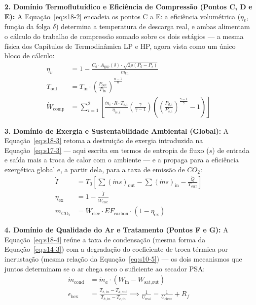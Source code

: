 \documentclass[12pt,a4paper]{article}
\numberwithin{equation}{section}
\numberwithin{table}{section}
\numberwithin{figure}{section}
\begin{document}
\textbf{2. Domínio Termoflutuídico e Eficiência de Compressão (Pontos C, D e E):} A Equação~\eqref{eq:s18-2} encadeia os pontos C a E: a eficiência volumétrica ($\eta_v$, função da folga $\delta$) determina a temperatura de descarga real, e ambas alimentam o cálculo do trabalho de compressão somado sobre os dois estágios — a mesma física dos Capítulos de Termodinâmica LP e HP, agora vista como um único bloco de cálculo:
\begin{equation}\label{eq:s18-2}
\begin{aligned}
	\eta_{v} &= 1 - \frac{C_d \cdotp A_{\text{gap}}(\delta) \cdotp \sqrt{2\rho (P_d - P_s)}}{\dot{m}_{\text{th}}} \\[8pt]
	T_{\text{out}} &= T_{\text{in}} \cdotp \left( \frac{P_{\text{out}}}{P_{\text{in}}} \right)^{\frac{n-1}{n}} \\[8pt]
	\dot{W}_{\text{comp}} &= \sum_{i=1}^{2} \left[ \frac{\dot{m}_i \cdotp R \cdotp T_{s,i}}{\eta_{is,i}} \left( \frac{\gamma}{\gamma - 1} \right) \left( \left( \frac{P_{d,i}}{P_{s,i}} \right)^{\frac{\gamma-1}{\gamma}} - 1 \right) \right]
\end{aligned}
\end{equation}

\textbf{3. Domínio de Exergia e Sustentabilidade Ambiental (Global):} A Equação~\eqref{eq:s18-3} retoma a destruição de exergia introduzida na Equação~\eqref{eq:s17-3} — aqui escrita em termos de entropia de fluxo ($s$) de entrada e saída mais a troca de calor com o ambiente — e a propaga para a eficiência exergética global e, a partir dela, para a taxa de emissão de $CO_2$:
\begin{equation}\label{eq:s18-3}
\begin{aligned}
	\dot{I} &= T_0 \left[ \sum (\dot{m}s)_{\text{out}} - \sum (\dot{m}s)_{\text{in}} - \frac{\dot{Q}}{T_{\text{surr}}} \right] \\[8pt]
	\eta_{\text{ex}} &= 1 - \frac{\dot{I}}{\dot{W}_{\text{elec}}} \\[8pt]
	\dot{m}_{\text{CO}_2} &= \dot{W}_{\text{elec}} \cdotp EF_{\text{carbon}} \cdotp (1 - \eta_{\text{ex}})
\end{aligned}
\end{equation}

\textbf{4. Domínio de Qualidade do Ar e Tratamento (Pontos F e G):} A Equação~\eqref{eq:s18-4} reúne a taxa de condensação (mesma forma da Equação~\eqref{eq:s14-3}) com a degradação do coeficiente de troca térmica por incrustação (mesma relação da Equação~\eqref{eq:s10-5}) — os dois mecanismos que juntos determinam se o ar chega seco o suficiente ao secador PSA:
\begin{equation}\label{eq:s18-4}
\begin{aligned}
	\dot{m}_{\text{cond}} &= \dot{m}_a \cdotp (W_{\text{in}} - W_{\text{sat,out}}) \\[8pt]
	\epsilon_{\text{hex}} &= \frac{T_{h,in} - T_{h,out}}{T_{h,in} - T_{c,in}} \implies \frac{1}{U_{\text{real}}} = \frac{1}{U_{\text{clean}}} + R_f
\end{aligned}
\end{equation}
\end{document}
